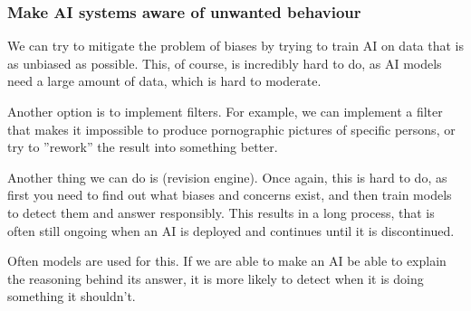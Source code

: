 \documentclass[
../EiKI_Summary.tex,
]
{subfiles}
\begin{document}
\subsubsection{Make AI systems aware of unwanted behaviour}
We can try to mitigate the problem of biases by trying to train AI on data that is as unbiased as possible. This, of course, is incredibly hard to do, as AI models need a large amount of data, which is hard to moderate. 

Another option is to implement filters. For example, we can implement a filter that makes it impossible to produce pornographic pictures of specific persons, or try to ''rework'' the result into something better.

Another thing we can do is  (revision engine). Once again, this is hard to do, as first you need to find out what biases and concerns exist, and then train models to detect them and answer responsibly. This results in a long process, that is often still ongoing when an AI is deployed and continues until it is discontinued.

Often  models are used for this. If we are able to make an AI be able to explain the reasoning behind its answer, it is more likely to detect when it is doing something it shouldn't.
\end{document}
